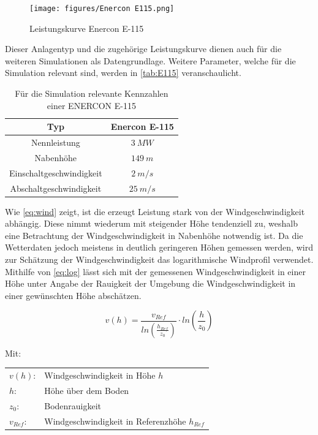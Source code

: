\begin{figure}[H]
	\centering
	\texttt{[image: figures/Enercon E115.png]}
	\caption{Leistungskurve Enercon E-115 \cite{E115}}
	\label{fig:Leistungskurve}
\end{figure}

Dieser Anlagentyp und die zugehörige Leistungskurve dienen auch für die weiteren Simulationen als Datengrundlage. Weitere Parameter, welche für die Simulation relevant sind, werden in \autoref{tab:E115} veranschaulicht.

\begin{table}
	\begin{tabular}[htpb]{c|c}
		Typ & Enercon E-115 \\
		\hline
		Nennleistung & $3~MW$ \\
		Nabenhöhe & $149~m$ \\
		Einschaltgeschwindigkeit & $2~m/s$ \\
		Abschaltgeschwindigkeit & $25~m/s$
	\end{tabular}
	\centering
	\caption{Für die Simulation relevante Kennzahlen einer ENERCON E-115 \cite{E115}}
	\label{tab:E115}
\end{table}

Wie \autoref{eq:wind} zeigt, ist die erzeugt Leistung stark von der Windgeschwindigkeit abhängig. Diese nimmt wiederum mit steigender Höhe tendenziell zu, weshalb eine Betrachtung der Windgeschwindigkeit in Nabenhöhe notwendig ist. Da die Wetterdaten jedoch meistens in deutlich geringeren Höhen gemessen werden, wird zur Schätzung der Windgeschwindigkeit das logarithmische Windprofil verwendet. Mithilfe von \autoref{eq:log} lässt sich mit der gemessenen Windgeschwindigkeit in einer Höhe unter Angabe der Rauigkeit der Umgebung die Windgeschwindigkeit in einer gewünschten Höhe abschätzen. \cite{Hoehenprofil}

\begin{equation}
	v(h) = \frac{v_{Ref}}{ln\left(\frac{h_{Ref}}{z_0}\right)} \cdot ln\left(\frac{h}{z_0}\right)
	\label{eq:log}
\end{equation}

Mit:

\begin{flushleft}
	\begin{tabular}[htpb]{ll}
		$v(h)$: & Windgeschwindigkeit in Höhe $h$ \\
		$h$: & Höhe über dem Boden \\
		$z_0$: & Bodenrauigkeit \\
		$v_{Ref}$: & Windgeschwindigkeit in Referenzhöhe $h_{Ref}$ 
	\end{tabular}
\end{flushleft}

